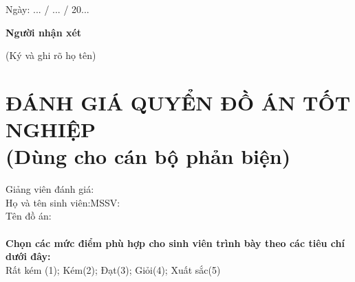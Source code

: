 \hspace{9cm} Ngày: ... / ... / 20...

\hspace{9.3cm}\textbf{Người nhận xét}

\vspace{-6pt}
\hspace{9cm}(Ký và ghi rõ họ tên)
\cleardoublepage

\section*{ĐÁNH GIÁ QUYỂN ĐỒ ÁN TỐT NGHIỆP\\\fontsize{14pt}{0pt}\selectfont \vspace{4pt}\textnormal{(Dùng cho cán bộ phản biện)}}
\thispagestyle{empty}
\vspace{-16pt}
\hspace{-1cm}Giảng viên đánh giá:\dotfill\\
Họ và tên sinh viên:\dotfill MSSV:\dotfill\\
Tên đồ án:\dotfill\\
\\
\textbf{Chọn các mức điểm phù hợp cho sinh viên trình bày theo các tiêu chí dưới đây:}\\
Rất kém (1); Kém(2); Đạt(3); Giỏi(4); Xuất sắc(5)
